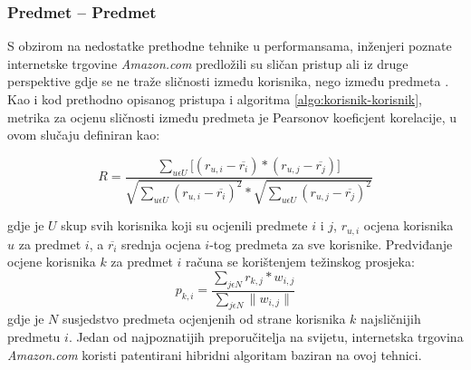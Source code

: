\documentclass[times, utf8, diplomski, numeric]{fer}
\begin{document}
\subsubsection{Predmet -- Predmet}
S obzirom na nedostatke prethodne tehnike u performansama, inženjeri poznate
internetske trgovine \emph{Amazon.com} predložili su sličan pristup ali iz druge
perspektive gdje se ne traže sličnosti između korisnika, nego između predmeta
\cite{amazon}. Kao i kod prethodno opisanog pristupa i algoritma
\ref{algo:korisnik-korisnik}, metrika za ocjenu sličnosti između predmeta je
Pearsonov koeficjent korelacije, u ovom slučaju definiran kao:

\begin{equation}
\label{eq:pearsonPredmet}
	R = \frac
			{\sum_{u \epsilon U} 
				\big[
					(r_{u,i} - \overline{r_i}) \ast
					(r_{u,j} - \overline{r_j})
				\big]
			}
			{
				\sqrt{{\sum_{u \epsilon U} (r_{u,i} - \overline{r_i})^2}} \ast 
				\sqrt{{\sum_{u \epsilon U} (r_{u,j} - \overline{r_j})^2}}
			}
\end{equation}

gdje je $U$ skup svih korisnika koji su ocjenili predmete $i$ i $j$, $r_{u,i}$
ocjena korisnika $u$ za predmet $i$, a $\overline{r_i}$ srednja ocjena $i$-tog
predmeta za sve korisnike. Predviđanje ocjene korisnika $k$ za predmet $i$
računa se korištenjem težinskog prosjeka:
\begin{equation}
\label{eq:tezinskiProsjek}
	p_{k,i} = 
		\frac
			{\sum_{j \epsilon N} r_{k,j} \ast w_{i,j}}
			{\sum_{j \epsilon N} \|w_{i,j}\|}
\end{equation}
gdje je $N$ susjedstvo predmeta ocjenjenih od strane korisnika $k$ najsličnijih
predmetu $i$. Jedan od najpoznatijih preporučitelja na svijetu, internetska
trgovina \emph{Amazon.com} koristi patentirani hibridni algoritam baziran na
ovoj tehnici.
\end{document}
